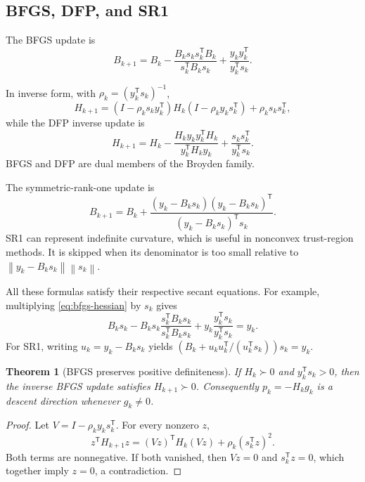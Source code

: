 \documentclass[12pt,oneside]{book}
\numberwithin{equation}{section}
\theoremstyle{definition}
\theoremstyle{plain}
\newtheorem{theorem}{Theorem}[section]
\theoremstyle{remark}
\newcommand{\norm}[1]{\left\lVert #1 \right\rVert}
\begin{document}
\subsection{BFGS, DFP, and SR1}

The BFGS update is
\begin{equation}
 B_{k+1}=B_k-\frac{B_ks_ks_k^\mathsf TB_k}{s_k^\mathsf TB_ks_k}
              +\frac{y_ky_k^\mathsf T}{y_k^\mathsf Ts_k}.
 \label{eq:bfgs-hessian}
\end{equation}

In inverse form, with $\rho_k=(y_k^\mathsf Ts_k)^{-1}$,
\begin{equation}
 H_{k+1}=(I-\rho_ks_ky_k^\mathsf T)H_k
         (I-\rho_ky_ks_k^\mathsf T)+\rho_ks_ks_k^\mathsf T,
 \label{eq:bfgs-inverse}
\end{equation}
while the DFP inverse update is
\[
 H_{k+1}=H_k-\frac{H_ky_ky_k^\mathsf TH_k}{y_k^\mathsf TH_ky_k}
 +\frac{s_ks_k^\mathsf T}{y_k^\mathsf Ts_k}.
\]
BFGS and DFP are dual members of the Broyden family.

The symmetric-rank-one update is
\begin{equation}
 B_{k+1}=B_k+
 \frac{(y_k-B_ks_k)(y_k-B_ks_k)^\mathsf T}
 {(y_k-B_ks_k)^\mathsf Ts_k}.
 \label{eq:sr1-update}
\end{equation}
SR1 can represent indefinite curvature, which is useful in nonconvex
trust-region methods. It is skipped when its denominator is too small relative
to $\norm{y_k-B_ks_k}\norm{s_k}$.

All these formulas satisfy their respective secant equations. For example,
multiplying \cref{eq:bfgs-hessian} by $s_k$ gives
\[
 B_ks_k-B_ks_k\frac{s_k^\mathsf TB_ks_k}{s_k^\mathsf TB_ks_k}
 +y_k\frac{y_k^\mathsf Ts_k}{y_k^\mathsf Ts_k}=y_k.
\]
For SR1, writing $u_k=y_k-B_ks_k$ yields
$(B_k+u_ku_k^\mathsf T/(u_k^\mathsf Ts_k))s_k=y_k$.

\begin{theorem}[BFGS preserves positive definiteness]
If $H_k\succ0$ and $y_k^\mathsf Ts_k>0$, then the inverse BFGS update satisfies
$H_{k+1}\succ0$. Consequently $p_k=-H_kg_k$ is a descent direction whenever
$g_k\neq0$.
\end{theorem}

\begin{proof}
Let $V=I-\rho_ky_ks_k^\mathsf T$. For every nonzero $z$,
\[
 z^\mathsf TH_{k+1}z=(Vz)^\mathsf TH_k(Vz)+\rho_k(s_k^\mathsf Tz)^2.
\]
Both terms are nonnegative. If both vanished, then $Vz=0$ and
$s_k^\mathsf Tz=0$, which together imply $z=0$, a contradiction.
\end{proof}
\end{document}
